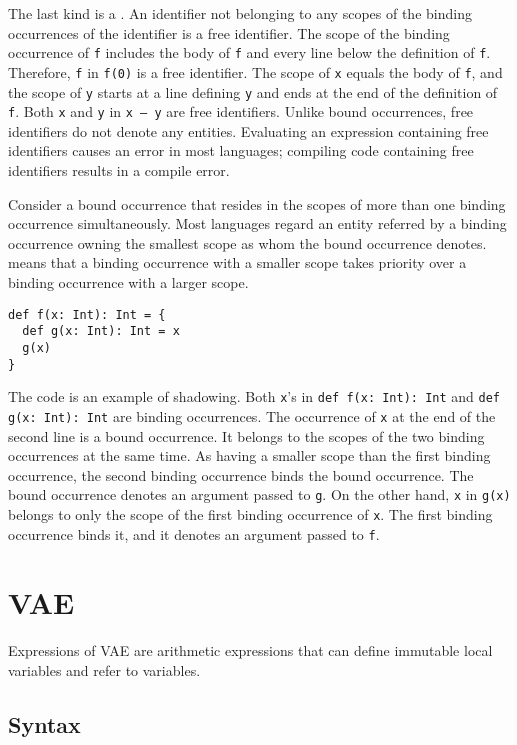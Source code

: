 The last kind is a . An identifier not belonging to any
scopes of the binding occurrences of the identifier is a free identifier. The
scope of the binding occurrence of \verb!f! includes the body of \verb!f! and
every line below the definition of \verb!f!. Therefore, \verb!f! in \verb!f(0)!
is a free identifier. The scope of \verb!x! equals the body of \verb!f!, and the
scope of \verb!y! starts at a line defining \verb!y! and ends at the end of the
definition of \verb!f!. Both \verb!x! and \verb!y! in \verb!x – y! are free
identifiers. Unlike bound occurrences, free identifiers do not denote any
entities. Evaluating an expression containing free identifiers causes an error in
most languages; compiling code containing free identifiers results in a compile
error.

Consider a bound occurrence that resides in the scopes of more than one binding
occurrence simultaneously. Most languages regard an entity referred by a binding
occurrence owning the smallest scope as whom the bound occurrence denotes.
 means that a binding occurrence with a smaller scope takes
priority over a binding occurrence with a larger scope.

\begin{verbatim}
def f(x: Int): Int = {
  def g(x: Int): Int = x
  g(x)
}
\end{verbatim}

The code is an example of shadowing. Both \verb!x!'s in \verb!def f(x: Int): Int!
and \verb!def g(x: Int): Int! are binding occurrences. The occurrence of \verb!x!
at the end of the second line is a bound occurrence. It belongs to the scopes of
the two binding occurrences at the same time. As having a smaller scope than the
first binding occurrence, the second binding occurrence binds the bound
occurrence. The bound occurrence denotes an argument passed to \verb!g!. On the
other hand, \verb!x! in \verb!g(x)! belongs to only the scope of the first
binding occurrence of \verb!x!. The first binding occurrence binds it, and it
denotes an argument passed to \verb!f!.

\section{VAE}

Expressions of VAE are arithmetic expressions that can define immutable local
variables and refer to variables.

\subsection{Syntax}

